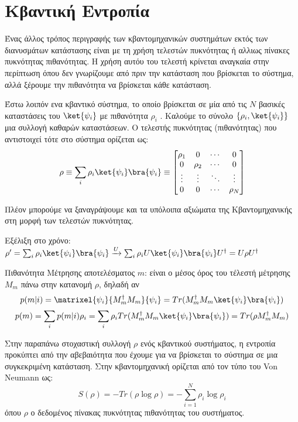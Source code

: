 \chapter{Κβαντική Εντροπία}

Ένας άλλος τρόπος περιγραφής των κβαντομηχανικών συστημάτων εκτός των διανυσμάτων κατάστασης είναι με τη χρήση τελεστών πυκνότητας ή αλλιως πίνακες πυκνότητας πιθανότητας. Η χρήση αυτόυ του τελεστή κρίνεται αναγκαία στην περίπτωση όπου δεν γνωρίζουμε από πριν την κατάσταση που βρίσκεται το σύστημα, αλλά ξέρουμε την πιθανότητα να βρίσκεται κάθε κατάσταση.

Έστω λοιπόν ενα κβαντικό σύστημα, το οποίο βρίσκεται σε μία από τις $Ν$ βασικές καταστάσεις του $\ket{\psi_i}$ με πιθανότητα $\rho_i$ . Καλούμε το σύνολο $\{\rho_i,\ket{\psi_i}\}$ μια συλλογή καθαρών καταστάσεων. Ο τελεστής πυκνότητας (πιθανότητας) που αντιστοιχεί τότε στο σύστημα ορίζεται ως: \[\rho \equiv \sum_i\rho_i\ket{\psi_i}\bra{\psi_i} \equiv
 \begin{bmatrix}\rho_1 & 0 & \cdots & 0 \\0 & \rho_2 & \cdots & 0 \\\vdots & \vdots & \ddots & \vdots \\0 & 0 & \cdots & \rho_N\end{bmatrix}
\]

Πλέον μπορούμε να ξαναγράψουμε και τα υπόλοιπα αξιώματα της Κβαντομηχανικής στη μορφή των τελεστών πυκνότητας.

Εξέλιξη στο χρόνο:   $ \rho' = \sum_i\rho_i\ket{\psi_i}\bra{\psi_i} \xrightarrow{U} \sum_i\rho_iU\ket{\psi_i}\bra{\psi_i}U^{\dagger{}} = U\rho U^{\dagger{}} $

Πιθανότητα Μέτρησης αποτελέσματος $m$: είναι ο μέσος όρος του τέλεστή μέτρησης $M_m$ πάνω στην κατανομή $\rho$, δηλαδή αν \[ p(m|i) = \matrixel{\psi_i}{M_m^{\dagger{}}M_m}{\psi_i} = Tr(M_m^{\dagger{}}M_m\ket{\psi_i}\bra{\psi_i}) \] \[p(m) = \sum_ip(m|i)\rho_i = \sum_i\rho_iTr(M_m^{\dagger{}}M_m\ket{\psi_i}\bra{\psi_i}) = Tr(\rho M_m^{\dagger{}}M_m)\]

Στην παραπάνω στοχαστική συλλογή $\rho$ ενός κβαντικού συστήματος, η εντροπία προκύπτει από την αβεβαιότητα που έχουμε για να βρίσκεται το σύστημα σε μια συγκεκριμένη κατάσταση. Στην κβαντομηχανική ορίζεται από τον τύπο του Von Neumann ως: \[S(\rho) = - Tr(\rho \log\rho) =  - \sum_{i=1}^{N}\rho_i \log \rho_i\] όπου $\rho$ ο δεδομένος πίνακας πυκνότητας πιθανότητας του συστήματος.
